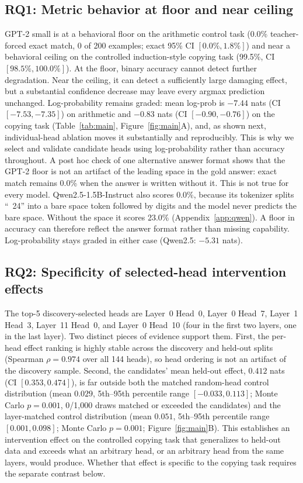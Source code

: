 \documentclass{article}
\begin{document}
\subsection{RQ1: Metric behavior at floor and near ceiling}
\label{sec:rq1}

GPT-2 small is at a behavioral floor on the arithmetic control task
(0.0\% teacher-forced exact match, 0 of 200 examples; exact 95\% CI
$[0.0\%, 1.8\%]$)
and near a behavioral ceiling on the controlled induction-style
copying task (99.5\%, CI $[98.5\%,100.0\%]$). At the floor, binary
accuracy cannot detect further degradation. Near the ceiling, it can
detect a sufficiently large damaging effect, but a substantial
confidence decrease may leave every argmax prediction unchanged. Log-probability
remains graded: mean log-prob is $-7.44$ nats (CI
$[-7.53,-7.35]$) on arithmetic and $-0.83$ nats (CI $[-0.90,-0.76]$) on
the copying task (Table~\ref{tab:main}, Figure~\ref{fig:main}A), and, as shown
next, individual-head
ablation moves it substantially and reproducibly. This is why we select
and validate candidate heads using log-probability rather than accuracy
throughout. A post hoc check of one alternative answer format shows that
the GPT-2 floor is not an artifact of the leading space in the gold
answer: exact match remains 0.0\% when the answer is written without it.
This is not true for every model. Qwen2.5-1.5B-Instruct also scores
0.0\%, because its tokenizer splits ``\ 24'' into a bare space token
followed by digits and the model never predicts the bare space. Without
the space it scores 23.0\% (Appendix~\ref{app:qwen}). A floor in
accuracy can therefore reflect the answer format rather than missing
capability. Log-probability stays graded in either case (Qwen2.5:
$-5.31$ nats).

\subsection{RQ2: Specificity of selected-head intervention effects}
\label{sec:rq2}

The top-5 discovery-selected heads are Layer~0 Head~0, Layer~0 Head~7,
Layer~1 Head~3, Layer~11 Head~0, and Layer~0 Head~10 (four in the first
two layers, one in the last layer). Two distinct pieces of evidence
support them. First, the per-head effect ranking is highly stable across
the discovery and held-out splits (Spearman $\rho=0.974$ over all 144
heads), so head ordering is not an artifact of the discovery sample.
Second, the candidates' mean held-out effect, $0.412$ nats (CI
$[0.353,0.474]$), is far outside both the matched random-head control
distribution (mean $0.029$, 5th--95th percentile range
$[-0.033,0.113]$; Monte Carlo $p=0.001$,
0/1{,}000 draws matched or exceeded the candidates) and the
layer-matched control distribution (mean $0.051$, 5th--95th percentile
range $[0.001,0.098]$;
Monte Carlo $p=0.001$; Figure~\ref{fig:main}B). This establishes an
intervention effect on the controlled copying task that generalizes to
held-out data and exceeds what an arbitrary
head, or an arbitrary head from the same layers, would produce. Whether
that effect is specific to the copying task requires the separate contrast below.
\end{document}
